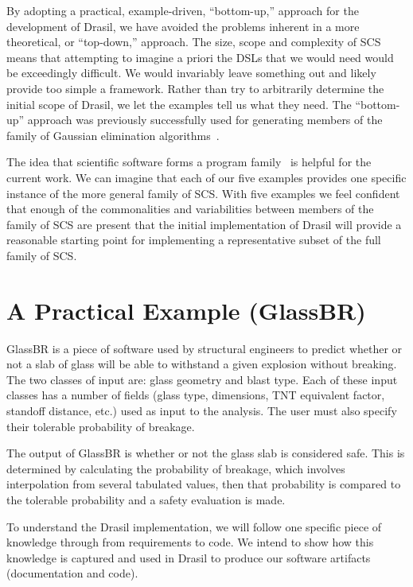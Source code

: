 \documentclass[sigconf]{acmart}
\begin{document}
By adopting a practical, example-driven, ``bottom-up,'' approach for the
development of Drasil, we have avoided the problems inherent in a more
theoretical, or ``top-down,'' approach.  The size, scope and complexity of SCS
means that attempting to imagine a priori the DSLs that we would need would be
exceedingly difficult.  We would invariably leave something out and likely
provide too simple a framework.  Rather than try to arbitrarily determine the
initial scope of Drasil, we let the examples tell us what they need. The
``bottom-up'' approach was previously successfully used for generating members
of the family of Gaussian elimination algorithms~\cite{Carette2006}.  

The idea that scientific software forms a program
family~\cite{SmithMcCutchanAndCao2007} is helpful for the current work.  We can
imagine that each of our five examples provides one specific instance of the
more general family of SCS.  With five examples we feel confident that enough of
the commonalities and variabilities between members of the family of SCS are
present that the initial implementation of Drasil will provide a reasonable
starting point for implementing a representative subset of the full family of
SCS.

\section{A Practical Example (GlassBR)} \label{SecGlassBR}

GlassBR is a piece of software used by structural engineers to predict whether or 
not a slab of glass will be able to withstand a given explosion without
breaking.  The two classes of input are: glass geometry and blast type. Each of these input 
classes has a number of fields (glass type, dimensions, TNT equivalent factor, 
standoff distance, etc.) used as input to the analysis. The user must also 
specify their tolerable probability of breakage.

The output of GlassBR is whether or not the glass slab is considered safe.  This
is determined by calculating the probability of breakage, which involves
interpolation from several tabulated values, then that probability is compared
to the tolerable probability and a safety evaluation is made.

To understand the Drasil implementation, we will follow one specific piece of 
knowledge through from requirements to code. We intend to show how this 
knowledge is captured and used in Drasil to produce our software artifacts 
(documentation and code).
\end{document}
